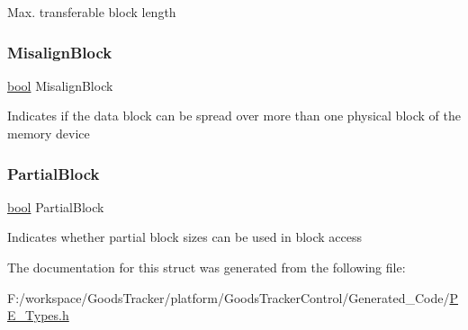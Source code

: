 Max. transferable block length \mbox{\label{struct_l_d_d___s_d_h_c___t_card_access_a5b08187d657371000fc5fa5881c5035e}} 
\subsubsection{\texorpdfstring{Misalign\+Block}{MisalignBlock}}
{\footnotesize\ttfamily \hyperlink{group___p_e___types__module_ga97a80ca1602ebf2303258971a2c938e2}{bool} Misalign\+Block}

Indicates if the data block can be spread over more than one physical block of the memory device \mbox{\label{struct_l_d_d___s_d_h_c___t_card_access_a47b8a92a3af829fc1cfec79e6b30ba63}} 
\subsubsection{\texorpdfstring{Partial\+Block}{PartialBlock}}
{\footnotesize\ttfamily \hyperlink{group___p_e___types__module_ga97a80ca1602ebf2303258971a2c938e2}{bool} Partial\+Block}

Indicates whether partial block sizes can be used in block access 

The documentation for this struct was generated from the following file\+:\begin{DoxyCompactItemize}
\item 
F\+:/workspace/\+Goods\+Tracker/platform/\+Goods\+Tracker\+Control/\+Generated\+\_\+\+Code/\hyperlink{_p_e___types_8h}{P\+E\+\_\+\+Types.\+h}\end{DoxyCompactItemize}
